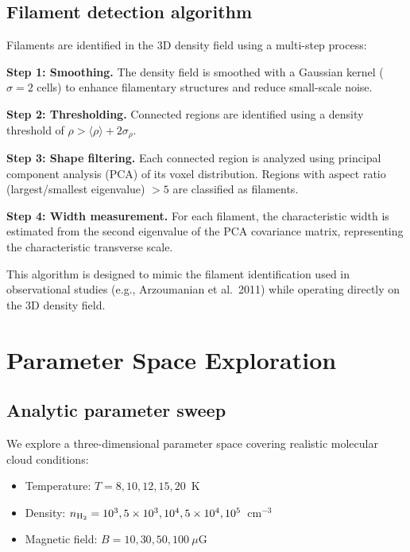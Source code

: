 \documentclass{mnras}
\begin{document}
\subsection{Filament detection algorithm}

Filaments are identified in the 3D density field using a multi-step process:

\textbf{Step 1: Smoothing.} The density field is smoothed with a Gaussian kernel ($\sigma = 2$ cells) to enhance filamentary structures and reduce small-scale noise.

\textbf{Step 2: Thresholding.} Connected regions are identified using a density threshold of $\rho > \langle \rho \rangle + 2\sigma_\rho$.

\textbf{Step 3: Shape filtering.} Each connected region is analyzed using principal component analysis (PCA) of its voxel distribution. Regions with aspect ratio (largest/smallest eigenvalue) $> 5$ are classified as filaments.

\textbf{Step 4: Width measurement.} For each filament, the characteristic width is estimated from the second eigenvalue of the PCA covariance matrix, representing the characteristic transverse scale.

This algorithm is designed to mimic the filament identification used in observational studies (e.g., Arzoumanian et al.~2011) while operating directly on the 3D density field.


\section{Parameter Space Exploration}

\subsection{Analytic parameter sweep}

We explore a three-dimensional parameter space covering realistic molecular cloud conditions:
\begin{itemize}
\item Temperature: $T = 8, 10, 12, 15, 20$~K
\item Density: $n_{\rm H_2} = 10^3, 5\times10^3, 10^4, 5\times10^4, 10^5$~cm$^{-3}$
\item Magnetic field: $B = 10, 30, 50, 100~\mu$G
\end{itemize}
\end{document}

